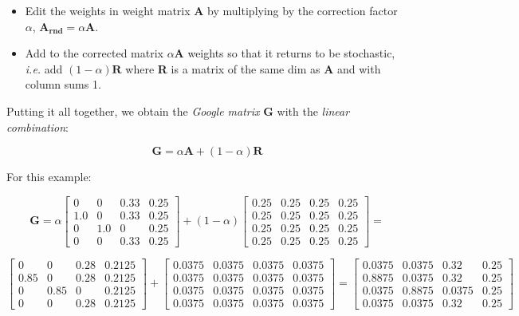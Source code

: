 \begin{itemize}
\item Edit the weights in weight matrix \textbf{A} by multiplying by the correction
factor $\alpha$, $\mathbf{A_{rnd}} = \alpha \mathbf{A}$.

\item Add to the corrected matrix $\alpha\mathbf{A}$ weights so that it returns to
be stochastic, \emph{i.e.} add $(1 - \alpha) \mathbf{R}$ where \textbf{R} is a matrix
of the same dim as \textbf{A} and with column sums 1.
\end{itemize}

Putting it all together, we obtain the \emph{Google matrix} \textbf{G} with the \emph{linear
combination}:

$$
\mathbf{G} = \alpha \mathbf{A} + (1 - \alpha) \mathbf{R}
$$

For this example:

$$
\mathbf{G} =
\alpha \left[\begin{matrix}0 & 0 & 0.33 & 0.25\\1.0 & 0 & 0.33 & 0.25\\0 & 1.0 & 0 & 0.25\\0 & 0 & 0.33 & 0.25\end{matrix}\right] +
(1 - \alpha) \left[\begin{matrix}0.25 & 0.25 & 0.25 & 0.25\\0.25 & 0.25 & 0.25 & 0.25\\0.25 & 0.25 & 0.25 & 0.25\\0.25 & 0.25 & 0.25 & 0.25\end{matrix}\right] =
$$

$$
\left[\begin{matrix}0 & 0 & 0.28 & 0.2125\\0.85 & 0 & 0.28 & 0.2125\\0 & 0.85 & 0 & 0.2125\\0 & 0 & 0.28 & 0.2125\end{matrix}\right] +
\left[\begin{matrix}0.0375 & 0.0375 & 0.0375 & 0.0375\\0.0375 & 0.0375 & 0.0375 & 0.0375\\0.0375 & 0.0375 & 0.0375 & 0.0375\\0.0375 & 0.0375 & 0.0375 & 0.0375\end{matrix}\right] =
\left[\begin{matrix}0.0375 & 0.0375 & 0.32 & 0.25\\0.8875 & 0.0375 & 0.32 & 0.25\\0.0375 & 0.8875 & 0.0375 & 0.25\\0.0375 & 0.0375 & 0.32 & 0.25\end{matrix}\right]
$$

